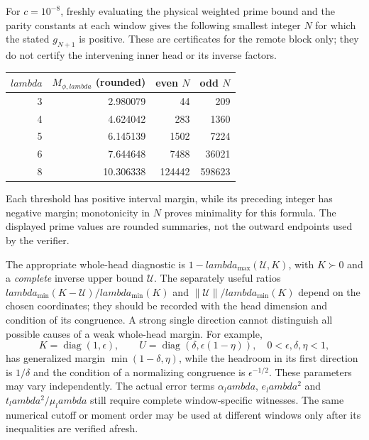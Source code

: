 \documentclass[11pt]{article}
\def\lambda{lambda}%
\theoremstyle{remark}
\begin{document}
For $c=10^{-8}$, freshly evaluating the physical weighted prime bound
and the parity constants at each window gives the following smallest
integer $N$ for which the stated $g_{N+1}$ is positive.  These are
certificates for the remote block only; they do not certify the
intervening inner head or its inverse factors.
\begin{center}
\begin{tabular}{rrrr}
\toprule
$\lambda$ & $M_{\phi,\lambda}$ (rounded) & even $N$ & odd $N$\\
\midrule
3&2.980079&44&209\\
4&4.624042&283&1360\\
5&6.145139&1502&7224\\
6&7.644648&7488&36021\\
8&10.306338&124442&598623\\
\bottomrule
\end{tabular}
\end{center}
Each threshold has positive interval margin, while its preceding
integer has negative margin; monotonicity in $N$ proves minimality
for this formula.  The displayed prime values are rounded summaries,
not the outward endpoints used by the verifier.

The appropriate whole-head diagnostic is
$1-\lambda_{\max}(\mathcal U,K)$, with $K\succ0$ and a
\emph{complete} inverse upper bound $\mathcal U$.  The separately
useful ratios $\lambda_{\min}(K-\mathcal U)/\lambda_{\min}(K)$ and
$\|\mathcal U\|/\lambda_{\min}(K)$ depend on the chosen coordinates;
they should be recorded with the head dimension and condition of
its congruence.  A strong single direction cannot distinguish all
possible causes of a weak whole-head margin.  For example,
\[
 K=\operatorname{diag}(1,\epsilon),\qquad
 U=\operatorname{diag}(\delta,\epsilon(1-\eta)),
 \quad 0<\epsilon,\delta,\eta<1,
\]
has generalized margin $\min(1-\delta,\eta)$, while the headroom
in its first direction is $1/\delta$ and the condition of a
normalizing congruence is $\epsilon^{-1/2}$.  These parameters
may vary independently.  The actual error terms
$\alpha_\lambda$, $e_\lambda^2$ and $t_\lambda^2/\mu_\lambda$
still require complete window-specific witnesses.  The same
numerical cutoff or moment order may be used at different windows
only after its inequalities are verified afresh.
\end{document}
